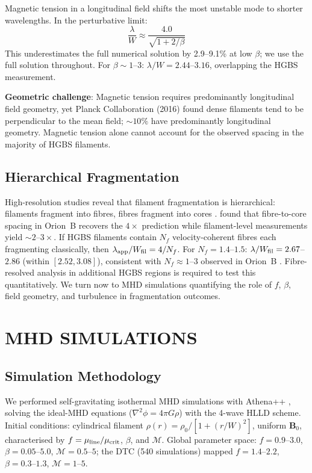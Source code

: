\documentclass[twoside,twocolumn]{mnras}
\begin{document}
Magnetic tension in a longitudinal field \citep{Nakamura1993} shifts the most unstable
mode to shorter wavelengths. In the perturbative limit:
\begin{equation}
\frac{\lambda}{W} \approx \frac{4.0}{\sqrt{1 + 2/\beta}}
\label{eq:tension}
\end{equation}
This underestimates the full numerical solution by 2.9--9.1\% at low $\beta$; we use
the full solution throughout. For $\beta \sim 1$--$3$: $\lambda/W = 2.44$--$3.16$,
overlapping the HGBS measurement.

\textbf{Geometric challenge}: Magnetic tension requires predominantly longitudinal field
geometry, yet Planck Collaboration (2016) found dense filaments tend to be perpendicular
to the mean field; ${\sim}10\%$ have predominantly longitudinal geometry. Magnetic tension
alone cannot account for the observed spacing in the majority of HGBS filaments.

\subsection{Hierarchical Fragmentation}

High-resolution studies reveal that filament fragmentation is hierarchical: filaments
fragment into fibres, fibres fragment into cores \citep{Hacar2013, Hacar2018}.
\citet{Yang2024} found that fibre-to-core spacing in Orion~B recovers the $4\times$
prediction while filament-level measurements yield ${\sim}2$--$3\times$. If HGBS
filaments contain $N_f$ velocity-coherent fibres each fragmenting classically, then
$\lambda_{\rm app}/W_{\rm fil} = 4/N_f$. For $N_f = 1.4$--$1.5$:
$\lambda/W_{\rm fil} = 2.67$--$2.86$ (within $[2.52, 3.08]$), consistent with
$N_f \approx 1$--$3$ observed in Orion~B \citep{Hacar2018}.
Fibre-resolved analysis in additional HGBS regions is required to test this quantitatively.
We turn now to MHD simulations quantifying the role of $f$, $\beta$, field geometry,
and turbulence in fragmentation outcomes.

\section{MHD SIMULATIONS}

\subsection{Simulation Methodology}

We performed self-gravitating isothermal MHD simulations with Athena++ \citep{Stone2020},
solving the ideal-MHD equations ($\nabla^2\phi = 4\pi G\rho$) with the 4-wave HLLD
scheme. Initial conditions: cylindrical filament $\rho(r) = \rho_0/[1+(r/W)^2]$,
uniform $\mathbf{B}_0$, characterised by $f = \mu_{\rm line}/\mu_{\rm crit}$, $\beta$,
and $\mathcal{M}$. Global parameter space: $f=0.9$--$3.0$, $\beta=0.05$--$5.0$,
$\mathcal{M}=0.5$--$5$; the DTC (540 simulations) mapped $f=1.4$--$2.2$,
$\beta=0.3$--$1.3$, $\mathcal{M}=1$--$5$.
\end{document}
